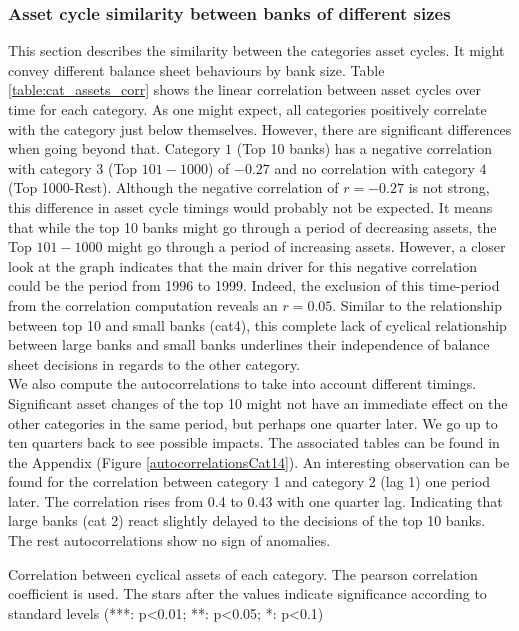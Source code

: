 \documentclass[12pt, a4paper]{article} %
\begin{document}
\subsubsection{Asset cycle similarity between banks of different sizes}
This section describes the similarity between the categories asset cycles. It might convey different balance sheet behaviours by bank size. Table \ref{table:cat_assets_corr} shows the linear correlation between asset cycles over time for each category. As one might expect, all categories positively correlate with the category just below themselves. However, there are significant differences when going beyond that. Category $1$ (Top 10 banks) has a negative correlation with category $3$ (Top $101-1000$) of $-0.27$ and no correlation with category $4$ (Top 1000-Rest). Although the negative correlation of $r=-0.27$ is not strong, this difference in asset cycle timings would probably not be expected. It means that while the top 10 banks might go through a period of decreasing assets, the Top $101-1000$ might go through a period of increasing assets. However, a closer look at the graph indicates that the main driver for this negative correlation could be the period from 1996 to 1999. Indeed, the exclusion of this time-period from the correlation computation reveals an $r=0.05$. Similar to the relationship between top 10 and small banks (cat4), this complete lack of cyclical relationship between large banks and small banks underlines their independence of balance sheet decisions in regards to the other category.\\
We also compute the autocorrelations to take into account different timings. Significant asset changes of the top 10 might not have an immediate effect on the other categories in the same period, but perhaps one quarter later. We go up to ten quarters back to see possible impacts. The associated tables can be found in the Appendix (Figure \ref{autocorrelationsCat14}). An interesting observation can be found for the correlation between category 1 and category 2 (lag 1) one period later. The correlation rises from 0.4 to 0.43 with one quarter lag. Indicating that large banks (cat 2) react slightly delayed to the decisions of the top 10 banks. The rest autocorrelations show no sign of anomalies.



\begin{table}[H]
\begin{minipage}{\textwidth}
\centering

\caption[1]{Correlation between cyclical assets of each category. The pearson correlation coefficient is used. The stars after the values indicate significance according to standard levels (***: p<0.01; **: p<0.05; *: p<0.1) }
\label{table:cat_assets_corr}
\end{minipage}
\end{table} 
\end{document}
